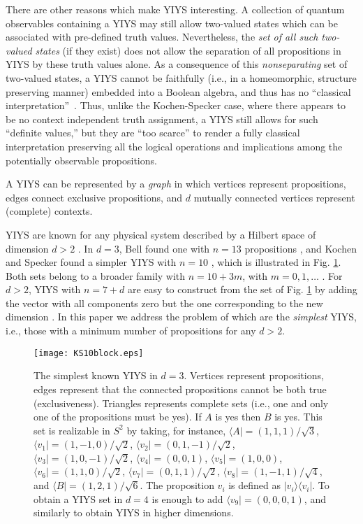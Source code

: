 \documentclass[twocolumn,aps,pra,showpacs]{revtex4-1}
\begin{document}
There are other reasons which make YIYS interesting.
A collection of quantum observables containing a YIYS  may still allow
two-valued states which can be associated with pre-defined truth values.
Nevertheless,
the {\em set of all such  two-valued states} (if they exist) does not allow the separation
of all propositions in YIYS by these truth values alone.
As a consequence of this {\em nonseparating} set of two-valued states,
a YIYS cannot be faithfully (i.e., in a homeomorphic, structure preserving manner)
embedded into a Boolean algebra, and thus has no ``classical interpretation''~\cite{pulmannova-91,svozil-ql,CalHerSvo,svozil-2006-omni}.
Thus, unlike the Kochen-Specker case, where there appears to be no context independent truth assignment,
a YIYS still allows for such ``definite values,''
but they are ``too scarce'' to render a fully classical interpretation preserving all the logical operations and implications among the
potentially observable propositions.

A YIYS can be represented by a {\em graph} in which vertices
represent propositions, edges connect exclusive propositions,
and $d$ mutually connected vertices represent (complete)
contexts.

YIYS are known for any physical system described by a Hilbert
space of dimension $d>2$ \cite{KS65, Bell66, KS67}. In $d=3$,
Bell found one with $n=13$ propositions \cite{Bell66}, and
Kochen and Specker found a simpler YIYS with $n=10$ \cite{KS65,
KS67}, which is illustrated in Fig. \ref{KS10}. Both sets
belong to a broader family with $n=10+3 m$, with $m=0,1,\ldots$
\cite{CG95}. For $d>2$, YIYS with $n=7+d$ are easy to construct
from the set of Fig. \ref{KS10} by adding the vector with all
components zero but the one corresponding to the new dimension
\cite{CG96}. In this paper we address the problem of which are
the {\em simplest} YIYS, i.e., those with a minimum number of
propositions for any $d>2$.


\begin{figure}
\centerline{\texttt{[image: KS10block.eps]}}
\caption{\label{KS10}
The simplest known YIYS in $d=3$. Vertices represent propositions,
edges represent that the connected propositions cannot be both true (exclusiveness).
Triangles represents complete sets (i.e., one and only one of the propositions must be yes).
If $A$ is yes then $B$ is yes. This set is realizable in $S^2$ by taking, for instance,
$\langle A|=(1,1,1)/\sqrt{3}$, $\langle v_1|=(1,-1,0)/\sqrt{2}$, $\langle v_2|=(0,1,-1)/\sqrt{2}$, $\langle v_3|=(1,0,-1)/\sqrt{2}$, $\langle v_4|=(0,0,1)$,
$\langle v_5|=(1,0,0)$, $\langle v_6|=(1,1,0)/\sqrt{2}$, $\langle v_7|=(0,1,1)/\sqrt{2}$, $\langle v_8|=(1,-1,1)/\sqrt{4}$, and $\langle B|=(1,2,1)/\sqrt{6}$.
The proposition $v_i$ is defined as $|v_i\rangle \langle v_i|$.
To obtain a YIYS set in $d=4$ is enough to add $\langle v_9|=(0,0,0,1)$, and similarly to obtain YIYS in higher dimensions.}
\end{figure}
\end{document}
